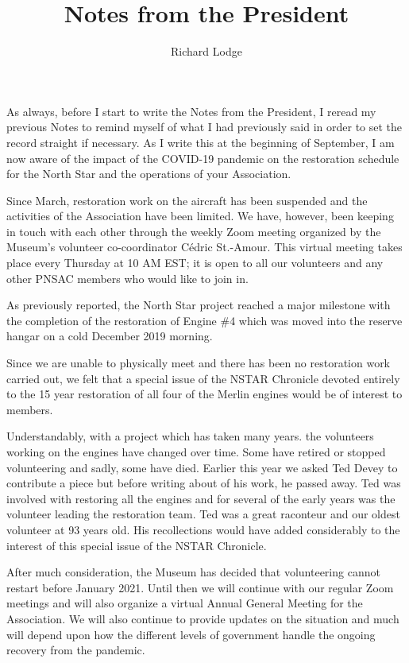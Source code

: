 
%


\title{Notes from the President}
\author{Richard Lodge}

\maketitle

As always, before I start to write the Notes from the President, I reread my
previous Notes to remind myself of what I had previously said in order to set
the record straight if necessary. As I write this at the beginning of
September, I am now aware of the impact of the COVID-19 pandemic on the
restoration schedule for the North Star and the operations of your
Association.

Since March, restoration work on the aircraft has been suspended and the
activities of the Association have been limited. We have, however, been keeping
in touch with each other through the weekly Zoom meeting organized by the
Museum's volunteer co-coordinator C\'edric St.-Amour. This virtual meeting
takes
place every Thursday at 10 AM EST; it is open to all our volunteers and any
other PNSAC members who would like to join in.

As previously reported, the North Star project reached a major milestone with
the completion of the restoration of Engine \#4 which was moved into the
reserve hangar on a cold December 2019 morning.

Since we are unable to physically meet and there has been no restoration work
carried out, we felt that a special issue of the NSTAR Chronicle devoted
entirely to the 15 year restoration of all four of the Merlin engines would be
of interest to members.

Understandably, with a project which has taken many years. the volunteers
working on the engines have changed over time. Some have retired or stopped
volunteering and sadly, some have died. Earlier this year we asked Ted Devey to
contribute a piece but before writing about of his work, he passed away. Ted
was involved with restoring all the engines and for several of the early years
was the volunteer leading the restoration team. Ted was a great raconteur and
our oldest volunteer at 93 years old. His recollections would have added
considerably to the interest of this special issue of the NSTAR
Chronicle.

After much consideration, the Museum has decided that volunteering cannot
restart before January 2021. Until then we will continue with our regular Zoom
meetings and will also organize a virtual Annual General Meeting for the
Association. We will also continue to provide updates on the situation and much
will depend upon how the different levels of government handle the ongoing
recovery from the pandemic.

